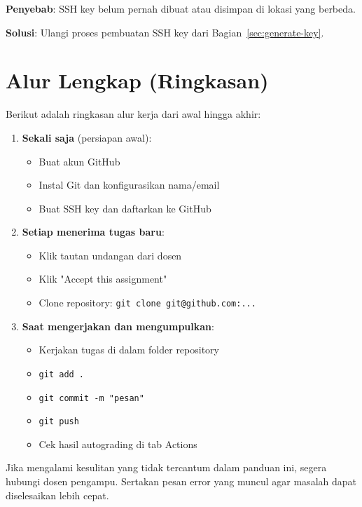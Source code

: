 \documentclass[
    a4paper,
    11pt,
    parskip=half
]{scrartcl}
\begin{document}
\textbf{Penyebab}: SSH key belum pernah dibuat atau disimpan di lokasi yang berbeda.

\textbf{Solusi}: Ulangi proses pembuatan SSH key dari Bagian~\ref{sec:generate-key}.

\section{Alur Lengkap (Ringkasan)}
\label{sec:summary}

Berikut adalah ringkasan alur kerja dari awal hingga akhir:

\begin{enumerate}
    \item \textbf{Sekali saja} (persiapan awal):
    \begin{itemize}
        \item Buat akun GitHub
        \item Instal Git dan konfigurasikan nama/email
        \item Buat SSH key dan daftarkan ke GitHub
    \end{itemize}

    \item \textbf{Setiap menerima tugas baru}:
    \begin{itemize}
        \item Klik tautan undangan dari dosen
        \item Klik "Accept this assignment"
        \item Clone repository: \texttt{git clone git@github.com:...}
    \end{itemize}

    \item \textbf{Saat mengerjakan dan mengumpulkan}:
    \begin{itemize}
        \item Kerjakan tugas di dalam folder repository
        \item \texttt{git add .}
        \item \texttt{git commit -m "pesan"}
        \item \texttt{git push}
        \item Cek hasil autograding di tab Actions
    \end{itemize}
\end{enumerate}

\begin{notebox}
Jika mengalami kesulitan yang tidak tercantum dalam panduan ini, segera hubungi dosen pengampu. Sertakan pesan error yang muncul agar masalah dapat diselesaikan lebih cepat.
\end{notebox}
\end{document}
